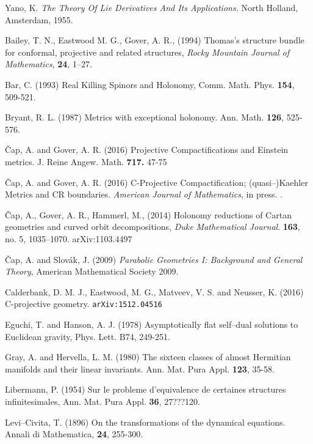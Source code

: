 \begin{thebibliography}{}
 Yano, K. {\em The Theory Of Lie Derivatives And Its Applications.} North Holland, Amsterdam, 1955.




 Bailey, T. N., Eastwood M. G., Gover, A. R., (1994)
Thomas's structure bundle for conformal, projective
  and related structures, {\em Rocky Mountain Journal of
    Mathematics}, {\bf 24}, 1--27.
  
 Bar, C. (1993) 
Real Killing Spinors and Holonomy,
Comm. Math. Phys. {\bf 154}, 509-521.

 Bryant, R. L. (1987)
Metrics with exceptional holonomy. Ann. Math. {\bf 126}, 525-576.


 \v Cap, A. and Gover, A. R. (2016)
Projective Compactifications and Einstein metrics.
J. Reine Angew. Math. {\bf 717.}  47-75

 \v Cap, A. and Gover, A. R. (2016)
C-Projective Compactification; (quasi--)Kaehler Metrics and CR boundaries.
{\em  American Journal of Mathematics}, in press. .

 \v Cap, A., Gover, A. R., Hammerl, M., (2014) 
  Holonomy reductions of Cartan geometries and curved orbit
  decompositions, {\em Duke Mathematical Journal}. 
{\bf 163}, no. 5, 1035--1070.
 \quad arXiv:1103.4497

  
\v{C}ap, A. and Slov\'ak, J. (2009)
\emph{Parabolic Geometries I: Background and General Theory},
American Mathematical Society 2009.


 Calderbank,  D. M. J.,  Eastwood, M. G.,  Matveev, V. S. and 
Neusser, K.  (2016) C-projective geometry. {\tt arXiv:1512.04516}






Eguchi, T. and Hanson, A. J. (1978) Asymptotically flat self--dual solutions
to Euclidean gravity, Phys. Lett. B74, 249-251.

Gray, A. and Hervella, L. M. (1980) The sixteen classes of almost Hermitian manifolds and their linear
invariants. Ann. Mat. Pura Appl. {\bf 123}, 35-58.

Libermann, P. (1954) Sur le probleme d'equivalence de certaines structures infinitesimales, Ann.
Mat. Pura Appl. {\bf 36}, 27???120.


 Levi--Civita, T. (1896) On the transformations of the 
dynamical equations. Annali di Mathematica, {\bf 24}, 255-300.


\end{thebibliography}
